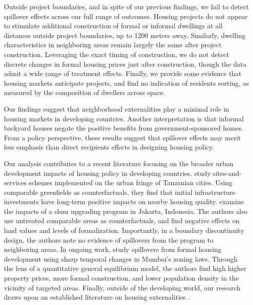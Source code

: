 \documentclass[12pt]{article}
\begin{document}
Outside project boundaries, and in spite of our previous findings, we fail to detect spillover effects  across our full range of outcomes.  Housing projects do not appear to stimulate additional construction of formal or informal dwellings at all distances outside project boundaries, up to 1200 meters away. Similarly, dwelling characteristics in neighboring areas remain largely the same after project construction.  Leveraging the exact timing of construction, we do not detect discrete changes in formal housing prices just after construction, though the data admit a wide range of treatment effects. Finally, we provide some evidence that housing markets anticipate projects, and find no indication of residents sorting, as measured by the composition of dwellers across space. 

Our findings suggest that neighborhood externalities play a minimal role in housing markets in developing countries.  Another interpretation is that informal backyard houses negate the positive benefits from government-sponsored homes. From a policy perspective, these results suggest that spillover effects may merit less emphasis than direct recipients effects in designing housing policy.  

Our analysis contributes to a recent literature focusing on the broader urban development impacts of housing policy in developing countries. \cite{baruah2017planning} study sites-and-services schemes implemented on the urban fringe of Tanzanian cities. Using comparable greenfields as counterfactuals, they find that initial infrastructure investments have long-term positive impacts on nearby housing quality. \cite{harari2018slum} examine the impacts of a slum upgrading program in Jakarta, Indonesia. The authors also use untreated comparable areas as counterfactuals, and find negative effects on land values and levels of formalization. Importantly, in a boundary discontinuity design, the authors note no evidence of spillovers from the program to neighboring areas. In ongoing work, \cite{gechter2018slums} study spillovers from formal housing development using sharp temporal changes in Mumbai's zoning laws. Through the lens of a quantitative general equilibrium model, the authors find high higher property prices,  more formal construction, and lower population density in the vicinity of targeted areas. Finally, outside of the developing world, our research draws upon an established literature on housing externalities \citep{rossi2010housing,hornbeck2017creative,diamond2016wants}. 
\end{document}
